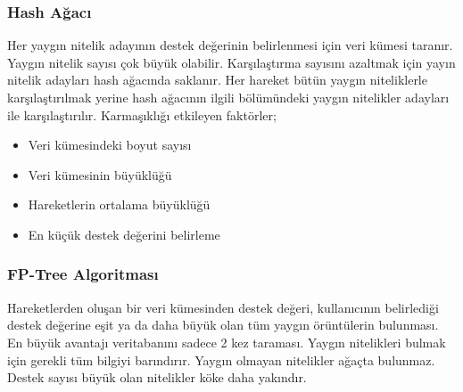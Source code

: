 \subsubsection{Hash Ağacı}
Her yaygın nitelik adayının destek değerinin belirlenmesi için veri kümesi taranır. Yaygın nitelik sayısı çok büyük olabilir. Karşılaştırma sayısını azaltmak için yayın nitelik adayları hash ağacında saklanır. Her hareket bütün yaygın niteliklerle karşılaştırılmak yerine hash ağacının ilgili bölümündeki yaygın nitelikler adayları ile karşılaştırılır. Karmaşıklığı etkileyen faktörler;
\begin{itemize}
    \item Veri kümesindeki boyut sayısı
    \item Veri kümesinin büyüklüğü
    \item Hareketlerin ortalama büyüklüğü
    \item En küçük destek değerini belirleme
\end{itemize}

\subsubsection{FP-Tree Algoritması}
Hareketlerden oluşan bir veri kümesinden destek değeri, kullanıcının belirlediği destek değerine eşit ya da daha büyük olan tüm yaygın örüntülerin bulunması. En büyük avantajı veritabanını sadece 2 kez taraması. Yaygın nitelikleri bulmak için gerekli tüm bilgiyi barındırır. Yaygın olmayan nitelikler ağaçta bulunmaz. Destek sayısı büyük olan nitelikler köke daha yakındır.

\newpage